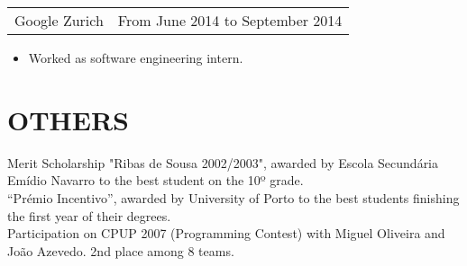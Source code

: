 \documentclass[margin]{res}
\begin{document}
\begin{resume}
                  \begin{tabular}{p{3in} r} %
                    Google Zurich &  From June 2014 to September 2014
                   \end{tabular}
                    \begin{itemize}
                      \item[] Worked as software engineering intern.
                    \end{itemize}

\section{OTHERS} Merit Scholarship "Ribas de Sousa 2002/2003", awarded by Escola Secundária Emídio Navarro to the best student on the 10º grade. \\
                  “Prémio Incentivo”, awarded by University of Porto to the best students finishing the first year of their degrees. \\
                  Participation on CPUP 2007 (Programming Contest) with Miguel Oliveira and João Azevedo. 2nd place among 8 teams. \\
                  

\end{resume}
\end{document}
